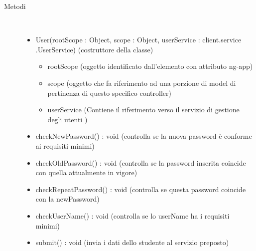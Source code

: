 \begin{description}
\item[Metodi] \hfill \\
 \vspace{-7mm}
\begin{itemize}
\item User(rootScope : Object, scope : Object, userService : client.service .UserService) (costruttore della classe)\begin{itemize}
\item rootScope (oggetto identificato dall’elemento con attributo ng-app)
\item scope (oggetto che fa riferimento ad una porzione di model di pertinenza di questo specifico controller)
\item userService (Contiene il riferimento verso il servizio di gestione degli utenti )
\end{itemize}

\item checkNewPassword() : void (controlla se la nuova password è conforme ai requisiti minimi)
\item checkOldPassword() : void (controlla se la password inserita coincide con quella attualmente in vigore)
\item checkRepeatPassword() : void (controlla se questa password coincide con la newPassword)
\item checkUserName() : void (controlla se lo userName ha i requisiti minimi)
\item submit() : void (invia i dati dello studente al servizio preposto)
\end{itemize}

\end{description}

\vspace{0.5cm}
